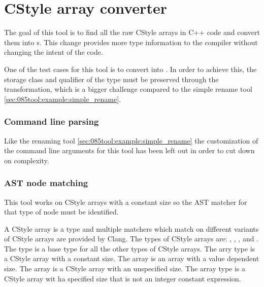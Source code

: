
\section{CStyle array converter}\label{sec:045tool:c_style_array}

The goal of this tool is to find all the raw CStyle arrays in C++ code and convert them into s. This change provides more type information to the compiler without changing the intent of the code.

One of the test cases for this tool is to convert  into . In order to achieve this, the storage class and qualifier of the type must be preserved through the transformation, which is a bigger challenge compared to the simple rename tool \cref{sec:085tool:example:simple_rename}.

\subsubsection*{Command line parsing}

Like the renaming tool \cref{sec:085tool:example:simple_rename} the customization of the command line arguments for this tool has been left out in order to cut down on complexity.

\subsubsection*{AST node matching}

This tool works on CStyle arrays with a constant size so the AST matcher for that type of node must be identified.

A CStyle array is a type and multiple matchers which match on different variants of CStyle arrays are provided by Clang. The types of CStyle arrays are: , , ,  and . \\
The  type is a base type for all the other types of CStyle arrays. The  arry type is a CStyle array with a constant size. The  array is an array with a value dependent size. The  array is a CStyle array with an unspecified size. The  array type is a CStyle array wit ha specified size that is not an integer constant expression.

